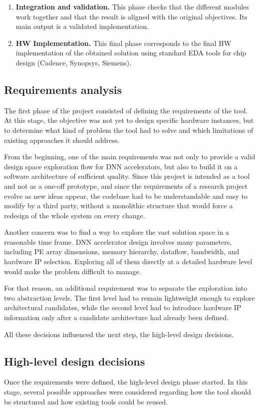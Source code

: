 \begin{enumerate}
\item \textbf{Integration and validation.} This phase checks that the
different modules work together and that the result is aligned with
the original objectives. Its main output is a validated
implementation.
\item \textbf{HW Implementation.} This final phase corresponds to the final 
HW implementation of the obtained solution using standard EDA tools for chip design 
(Cadence, Synopsys, Siemens).
\end{enumerate}

\subsection{Requirements analysis}
\label{subsec:requirements}
The first phase of the project consisted of defining the requirements
of the tool. At this stage, the objective was not yet to design
specific hardware instances, but to determine what kind of problem
the tool had to solve and which limitations of existing approaches it
should address.

From the beginning, one of the main requirements was not only to
provide a valid design space exploration flow for DNN accelerators,
but also to build it on a software architecture of sufficient
quality. Since this project is intended as a tool and not as a
one-off prototype, and since the requirements of a research project
evolve as new ideas appear, the codebase had to be understandable and
easy to modify by a third party, without a monolithic structure that
would force a redesign of the whole system on every change.

Another concern was to find a way to explore the vast solution space
in a reasonable time frame. DNN accelerator design involves many
parameters, including PE array dimensions, memory hierarchy,
dataflow, bandwidth, and hardware IP selection. Exploring all of them
directly at a detailed hardware level would make the problem
difficult to manage.

For that reason, an additional requirement was to separate the
exploration into two abstraction levels. The first level had to
remain lightweight enough to explore architectural candidates, while
the second level had to introduce hardware IP information only after
a candidate architecture had already been defined.

All these decisions influenced the next step, the high-level design
decisions.

\subsection{High-level design decisions}
Once the requirements were defined, the high-level design phase
started. In this stage, several possible approaches were considered
regarding how the tool should be structured and how existing tools
could be reused.

